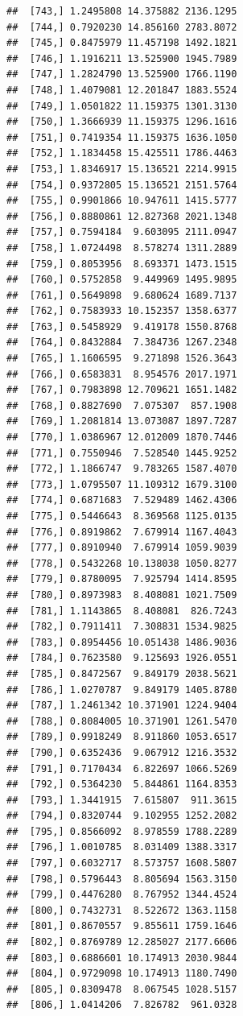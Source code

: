 \documentclass[article]{jss}\usepackage[]{graphicx}\usepackage[]{xcolor}
\makeatletter
\newenvironment{kframe}{%
 \def\at@end@of@kframe{}%
 \ifinner\ifhmode%
  \def\at@end@of@kframe{\end{minipage}}%
  \begin{minipage}{\columnwidth}%
 \fi\fi%
 \def\FrameCommand##1{\hskip\@totalleftmargin \hskip-\fboxsep
 \colorbox{shadecolor}{##1}\hskip-\fboxsep
     \hskip-\linewidth \hskip-\@totalleftmargin \hskip\columnwidth}%
 \MakeFramed {\advance\hsize-\width
   \@totalleftmargin\z@ \linewidth\hsize
   \@setminipage}}%
 {\par\unskip\endMakeFramed%
 \at@end@of@kframe}
\newenvironment{knitrout}{}{} %
\makeatother
\begin{document}
\begin{knitrout}
\begin{kframe}
\begin{verbatim}
##  [743,] 1.2495808 14.375882 2136.1295
##  [744,] 0.7920230 14.856160 2783.8072
##  [745,] 0.8475979 11.457198 1492.1821
##  [746,] 1.1916211 13.525900 1945.7989
##  [747,] 1.2824790 13.525900 1766.1190
##  [748,] 1.4079081 12.201847 1883.5524
##  [749,] 1.0501822 11.159375 1301.3130
##  [750,] 1.3666939 11.159375 1296.1616
##  [751,] 0.7419354 11.159375 1636.1050
##  [752,] 1.1834458 15.425511 1786.4463
##  [753,] 1.8346917 15.136521 2214.9915
##  [754,] 0.9372805 15.136521 2151.5764
##  [755,] 0.9901866 10.947611 1415.5777
##  [756,] 0.8880861 12.827368 2021.1348
##  [757,] 0.7594184  9.603095 2111.0947
##  [758,] 1.0724498  8.578274 1311.2889
##  [759,] 0.8053956  8.693371 1473.1515
##  [760,] 0.5752858  9.449969 1495.9895
##  [761,] 0.5649898  9.680624 1689.7137
##  [762,] 0.7583933 10.152357 1358.6377
##  [763,] 0.5458929  9.419178 1550.8768
##  [764,] 0.8432884  7.384736 1267.2348
##  [765,] 1.1606595  9.271898 1526.3643
##  [766,] 0.6583831  8.954576 2017.1971
##  [767,] 0.7983898 12.709621 1651.1482
##  [768,] 0.8827690  7.075307  857.1908
##  [769,] 1.2081814 13.073087 1897.7287
##  [770,] 1.0386967 12.012009 1870.7446
##  [771,] 0.7550946  7.528540 1445.9252
##  [772,] 1.1866747  9.783265 1587.4070
##  [773,] 1.0795507 11.109312 1679.3100
##  [774,] 0.6871683  7.529489 1462.4306
##  [775,] 0.5446643  8.369568 1125.0135
##  [776,] 0.8919862  7.679914 1167.4043
##  [777,] 0.8910940  7.679914 1059.9039
##  [778,] 0.5432268 10.138038 1050.8277
##  [779,] 0.8780095  7.925794 1414.8595
##  [780,] 0.8973983  8.408081 1021.7509
##  [781,] 1.1143865  8.408081  826.7243
##  [782,] 0.7911411  7.308831 1534.9825
##  [783,] 0.8954456 10.051438 1486.9036
##  [784,] 0.7623580  9.125693 1926.0551
##  [785,] 0.8472567  9.849179 2038.5621
##  [786,] 1.0270787  9.849179 1405.8780
##  [787,] 1.2461342 10.371901 1224.9404
##  [788,] 0.8084005 10.371901 1261.5470
##  [789,] 0.9918249  8.911860 1053.6517
##  [790,] 0.6352436  9.067912 1216.3532
##  [791,] 0.7170434  6.822697 1066.5269
##  [792,] 0.5364230  5.844861 1164.8353
##  [793,] 1.3441915  7.615807  911.3615
##  [794,] 0.8320744  9.102955 1252.2082
##  [795,] 0.8566092  8.978559 1788.2289
##  [796,] 1.0010785  8.031409 1388.3317
##  [797,] 0.6032717  8.573757 1608.5807
##  [798,] 0.5796443  8.805694 1563.3150
##  [799,] 0.4476280  8.767952 1344.4524
##  [800,] 0.7432731  8.522672 1363.1158
##  [801,] 0.8670557  9.855611 1759.1646
##  [802,] 0.8769789 12.285027 2177.6606
##  [803,] 0.6886601 10.174913 2030.9844
##  [804,] 0.9729098 10.174913 1180.7490
##  [805,] 0.8309478  8.067545 1028.5157
##  [806,] 1.0414206  7.826782  961.0328

\end{verbatim}
\end{kframe}
\end{knitrout}
\end{document}
